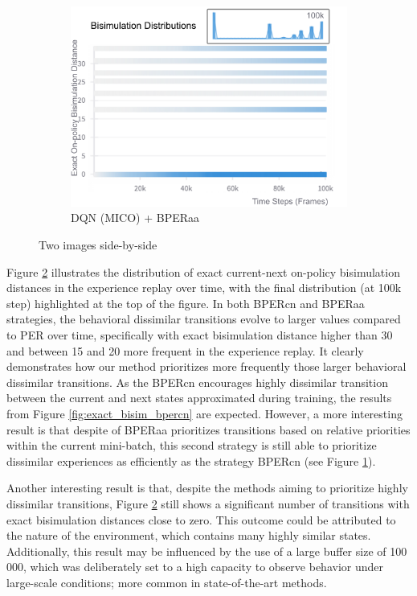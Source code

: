\begin{figure}[H]
\begin{subfigure}{0.32\textwidth}
        \includegraphics[width=\linewidth]{Results/grid_world/exact_bisimulation_dqn_mico_bperaa.png}
        \caption{DQN (MICO) + BPERaa}
        \label{fig:exact_bisim_bperaa}
    \end{subfigure}
    \caption{Two images side-by-side}
    \label{fig:exact_bisimulation_distributions}
\end{figure}


Figure \ref{fig:exact_bisimulation_distributions} illustrates the distribution of exact current-next on-policy bisimulation distances in the experience replay over time, with the final distribution (at 100k step) highlighted at the top of the figure. In both BPERcn and BPERaa strategies, the behavioral dissimilar transitions evolve to larger values compared to PER over time, specifically with exact bisimulation distance higher than 30 and between 15 and 20 more frequent in the experience replay. It clearly demonstrates how our method prioritizes more frequently those larger behavioral dissimilar transitions. As the BPERcn encourages highly dissimilar transition between the current and next states approximated during training, the results from Figure \ref{fig:exact_bisim_bpercn} are expected. However, a more interesting result is that despite of BPERaa prioritizes transitions based on relative priorities within the current mini-batch, this second strategy is still able to prioritize dissimilar experiences as efficiently as the strategy BPERcn (see Figure \ref{fig:exact_bisim_bperaa}).

Another interesting result is that, despite the methods aiming to prioritize highly dissimilar transitions, Figure \ref{fig:exact_bisimulation_distributions} still shows a significant number of transitions with exact bisimulation distances close to zero. This outcome could be attributed to the nature of the environment, which contains many highly similar states. Additionally, this result may be influenced by the use of a large buffer size of 100 000, which was deliberately set to a high capacity to observe behavior under large-scale conditions; more common in state-of-the-art methods.

